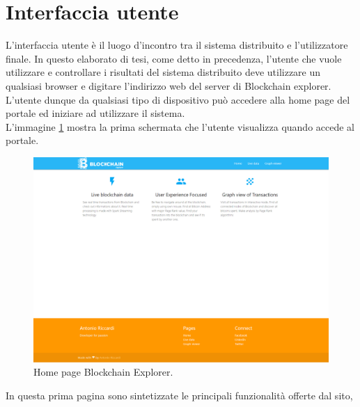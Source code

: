 \section{Interfaccia utente}
\label{sec:userInterface}
L'interfaccia utente è il luogo d'incontro tra il sistema distribuito e l'utilizzatore finale. In questo elaborato di tesi, come detto in precedenza, l'utente che vuole utilizzare e controllare i risultati del sistema distribuito deve utilizzare un qualsiasi browser e digitare l'indirizzo web del server di Blockchain explorer. L'utente dunque da qualsiasi tipo di dispositivo può accedere alla home page del portale ed iniziare ad utilizzare il sistema.
\\L'immagine \ref{fig:homePage} mostra la prima schermata che l'utente visualizza quando accede al portale.
\begin{figure}[H]
	\centering
	\includegraphics[width=\textwidth, height=0.60\textheight]{images/homePage.png}
	\caption{Home page Blockchain Explorer.}
	\label{fig:homePage}
\end{figure}
In questa prima pagina sono sintetizzate le principali funzionalità offerte dal sito,